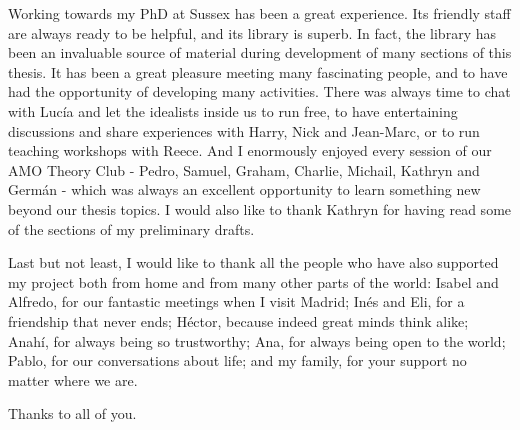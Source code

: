 \documentclass[a4paper,12pt,oneside]{report}
\newcommand\blankpage{
    \null
    \thispagestyle{empty}
    \newpage}
\begin{document}
Working towards my PhD at Sussex has been a great experience. Its friendly staff are always ready to be helpful, and its library is superb. In fact, the library has been an invaluable source of material during development of many sections of this thesis. It has been a great pleasure meeting many fascinating people, and to have had the opportunity of developing many activities. There was always time to chat with Luc\'{i}a and let the idealists inside us to run free, to have entertaining discussions and share experiences with Harry, Nick and Jean-Marc, or to run teaching workshops with Reece. And I enormously enjoyed every session of our AMO Theory Club - Pedro, Samuel, Graham, Charlie, Michail, Kathryn and Germ\'{a}n - which was always an excellent opportunity to learn something new beyond our thesis topics. I would also like to thank Kathryn for having read some of the sections of my preliminary drafts.  

Last but not least, I would like to thank all the people who have also supported my project both from home and from many other parts of the world: Isabel and Alfredo, for our fantastic meetings when I visit Madrid; In\'{e}s and Eli, for a friendship that never ends; H\'{e}ctor, because indeed great minds think alike; Anah\'{i}, for always being so trustworthy; Ana, for always being open to the world; Pablo, for our conversations about life; and my family, for your support no matter where we are.  

Thanks to all of you.



\newpage
{}
\tableofcontents 
\listoftables
{}
{}
\listoffigures
{}
{}
\end{document}
